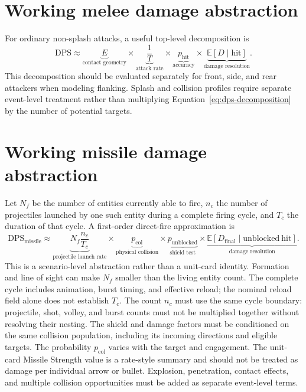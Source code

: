 \documentclass[11pt]{article}
\begin{document}
\section{Working melee damage abstraction}

For ordinary non-splash attacks, a useful top-level decomposition is
\begin{equation}
  \mathrm{DPS}
  \approx
  \underbrace{E}_{\text{contact geometry}}
  \times
  \underbrace{\frac{1}{T}}_{\text{attack rate}}
  \times
  \underbrace{p_{\mathrm{hit}}}_{\text{accuracy}}
  \times
  \underbrace{\mathbb{E}[D\mid\mathrm{hit}]}_{\text{damage resolution}}.
  \label{eq:dps-decomposition}
\end{equation}
This decomposition should be evaluated separately for front, side, and rear
attackers when modeling flanking.  Splash and collision profiles require
separate event-level treatment rather than multiplying
Equation~\ref{eq:dps-decomposition} by the number of potential targets.

\section{Working missile damage abstraction}

Let $N_f$ be the number of entities currently able to fire, $n_c$ the number
of projectiles launched by one such entity during a complete firing cycle,
and $T_c$ the duration of that cycle.  A first-order direct-fire approximation is
\begin{equation}
  \mathrm{DPS}_{\mathrm{missile}}
  \approx
  \underbrace{N_f\frac{n_c}{T_c}}_{\text{projectile launch rate}}
  \times
  \underbrace{p_{\mathrm{col}}}_{\text{physical collision}}
  \times
  \underbrace{p_{\mathrm{unblocked}}}_{\text{shield test}}
  \times
  \underbrace{\mathbb{E}[D_{\mathrm{final}}\mid
                         \mathrm{unblocked\ hit}]}_{\text{damage resolution}}.
  \label{eq:missile-dps}
\end{equation}
This is a scenario-level abstraction rather than a unit-card identity.
Formation and line of sight can make $N_f$ smaller than the living entity
count.  The complete cycle includes animation, burst timing, and effective
reload; the nominal reload field alone does not establish $T_c$.  The count
$n_c$ must use the same cycle boundary: projectile, shot, volley, and burst
counts must not be multiplied together without resolving their nesting.
The shield and damage factors must be conditioned on the same collision
population, including its incoming directions and eligible targets.
The probability $p_{\mathrm{col}}$ varies with the target and engagement.  The
unit-card Missile Strength value is a rate-style summary and should not be
treated as damage per individual arrow or bullet.  Explosion, penetration,
contact effects, and multiple collision opportunities must be added as
separate event-level terms.
\end{document}
